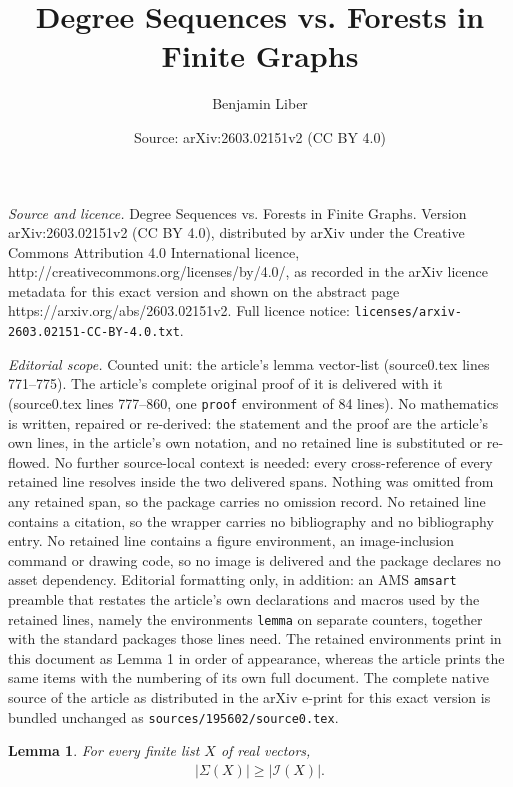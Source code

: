 \documentclass[10pt,a4paper]{amsart}
\title{Degree Sequences vs. Forests in Finite Graphs}
\author{Benjamin Liber}
\date{Source: arXiv:2603.02151v2 (CC BY 4.0)}
\newtheorem{lemma}{Lemma}
\newcommand{\abs}[1]{\left| #1 \right|}
\begin{document}
\maketitle

\noindent\emph{Source and licence.} Degree Sequences vs. Forests in Finite Graphs. Version arXiv:2603.02151v2 (CC BY 4.0), distributed by arXiv under the Creative Commons Attribution 4.0 International licence, http://creativecommons.org/licenses/by/4.0/, as recorded in the arXiv licence metadata for this exact version and shown on the abstract page https://arxiv.org/abs/2603.02151v2. Full licence notice: \texttt{licenses/arxiv-2603.02151-CC-BY-4.0.txt}.\par\smallskip

\noindent\textit{Editorial scope.} Counted unit: the article's lemma vector-list (source0.tex lines 771--775). The article's complete original proof of it is delivered with it (source0.tex lines 777--860, one \texttt{proof} environment of 84 lines). No mathematics is written, repaired or re-derived: the statement and the proof are the article's own lines, in the article's own notation, and no retained line is substituted or re-flowed.  No further source-local context is needed: every cross-reference of every retained line resolves inside the two delivered spans.  Nothing was omitted from any retained span, so the package carries no omission record.  No retained line contains a citation, so the wrapper carries no bibliography and no bibliography entry.  No retained line contains a figure environment, an image-inclusion command or drawing code, so no image is delivered and the package declares no asset dependency.  Editorial formatting only, in addition: an AMS \texttt{amsart} preamble that restates the article's own declarations and macros used by the retained lines, namely the environments \texttt{lemma} on separate counters, together with the standard packages those lines need.  The retained environments print in this document as Lemma 1 in order of appearance, whereas the article prints the same items with the numbering of its own full document.  The complete native source of the article as distributed in the arXiv e-print for this exact version is bundled unchanged as \texttt{sources/195602/source0.tex}.
\begin{lemma}\label{vector-list}
    For every finite list $X$ of real vectors, \begin{align}\label{subset_sums_index_sets}
        \abs{\Sigma(X)} \geq \abs{\mathcal{I}(X)}.
    \end{align}
\end{lemma}
\end{document}
